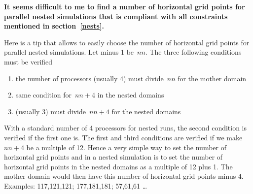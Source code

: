 \sk
\noindent \textbf{It seems difficult to me to find a number of horizontal grid points for parallel nested simulations that is compliant with all constraints mentioned in section~\ref{nests}.}
\begin{finger}
\item Here is a tip that allows to easily choose the number of horizontal grid points for parallel nested simulations. Let  minus 1 be~$nn$. The three following conditions must be verified
\begin{enumerate}
\item the number of processors (usually 4) must divide~$nn$ for the mother domain
\item same condition for~$nn+4$ in the nested domains
\item {} (usually 3) must divide~$nn+4$ for the nested domains
\end{enumerate}
With a standard number of 4 processors for nested runs, the second condition is verified if the first one is. The first and third conditions are verified if we make~$nn+4$ be a multiple of 12. Hence a very simple way to set the number of horizontal grid points  and  in a nested simulation is to set the number of horizontal grid points in the nested domains as a multiple of 12 plus 1. The mother domain would then have this number of horizontal grid points minus 4. Examples: 117,121,121; 177,181,181; 57,61,61 \ldots
\end{finger}







\clearemptydoublepage
